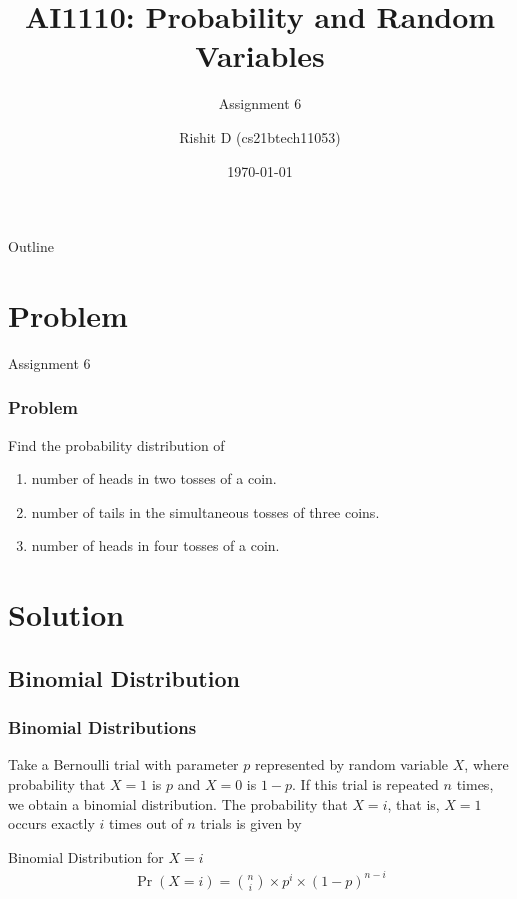 \documentclass{beamer}
\title{AI1110: Probability and Random Variables}
\subtitle{Assignment 6}
\author{Rishit D (cs21btech11053)}
\institute{IIT Hyderabad}
\date{\today}
\begin{document}
\begin{frame}
    \titlepage 
\end{frame}

\begin{frame}{Outline}
    \tableofcontents
\end{frame}

\section{Problem}

\begin{frame}{Assignment 6}
  \frametitle{Problem}
  Find the probability distribution of
  \begin{enumerate}
    \item number of heads in two tosses of a coin.
    \item number of tails in the simultaneous tosses of three coins.
    \item number of heads in four tosses of a coin.
  \end{enumerate}
\end{frame}

\section{Solution}
\subsection{Binomial Distribution}

\begin{frame}
  \frametitle{Binomial Distributions}
  Take a Bernoulli trial with parameter $p$ represented by random variable $X$, where probability that $X = 1$ is $p$ and $X = 0$ is $1-p$. If this trial is repeated $n$ times, we obtain a binomial distribution.
  The probability that $X = i$, that is, $X = 1$ occurs exactly $i$ times out of $n$ trials is given by
  \begin{block}{Binomial Distribution for $X = i$}
    \begin{align}
      \Pr(X = i) = \binom{n}{i} \times p^i \times (1-p)^{n-i}
      \label{eq:BinomProb}
    \end{align}
  \end{block}
\end{frame}


\end{document}

